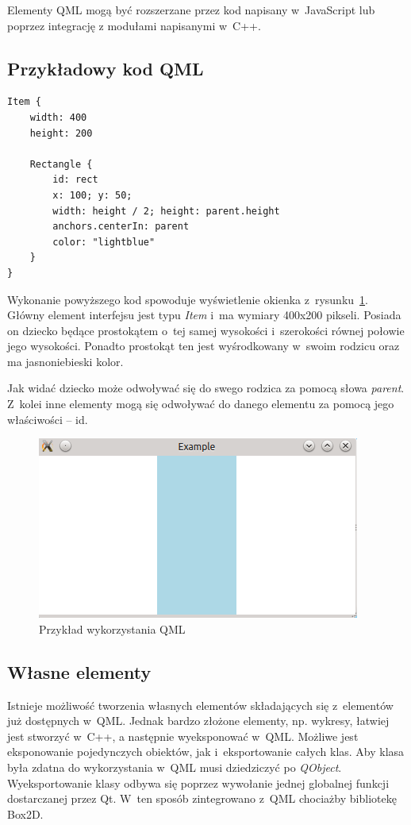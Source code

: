 Elementy QML mogą być rozszerzane przez kod napisany w~JavaScript lub poprzez integrację z modułami napisanymi w~C++.

\subsection{Przykładowy kod QML}

\begin{lstlisting}[caption=Okienko z niebieskim prostokątem, label=code:qml]
Item {
	width: 400
	height: 200

	Rectangle {
		id: rect
		x: 100; y: 50;
		width: height / 2; height: parent.height
		anchors.centerIn: parent
		color: "lightblue"
	}
}
\end{lstlisting}

Wykonanie powyższego kod spowoduje wyświetlenie okienka z~rysunku~\ref{rys:qml}. Główny element interfejsu jest typu \textit{Item} i~ma wymiary 400x200 pikseli. Posiada on dziecko będące prostokątem o~tej samej wysokości i~szerokości równej połowie jego wysokości. Ponadto prostokąt ten jest wyśrodkowany w~swoim rodzicu oraz ma jasnoniebieski kolor.

Jak widać dziecko może odwoływać się do swego rodzica za pomocą słowa \textit{parent}. Z~kolei inne elementy mogą się odwoływać do danego elementu za pomocą jego właściwości -- id.

\begin{figure}
\centering
\includegraphics{img/qml.png}
\caption{Przykład wykorzystania QML}\label{rys:qml}
\end{figure}

\subsection{Własne elementy}
Istnieje możliwość tworzenia własnych elementów składających się z~elementów już dostępnych w~QML. Jednak bardzo złożone elementy, np. wykresy, łatwiej jest stworzyć w~C++, a następnie wyeksponować w~QML. Możliwe jest eksponowanie pojedynczych obiektów, jak i~eksportowanie całych klas. Aby klasa była zdatna do wykorzystania w~QML musi dziedziczyć po \textit{QObject}. Wyeksportowanie klasy odbywa się poprzez wywołanie jednej globalnej funkcji dostarczanej przez Qt. W~ten sposób zintegrowano z~QML chociażby bibliotekę Box2D.


